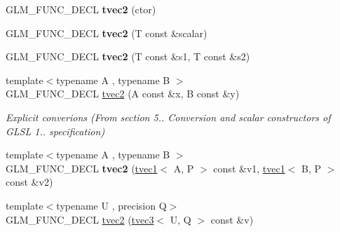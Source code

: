 \begin{DoxyCompactItemize}
\item 
\hypertarget{structglm_1_1tvec2_a0bff52067abf2c6333c7b498e4067db4}{G\-L\-M\-\_\-\-F\-U\-N\-C\-\_\-\-D\-E\-C\-L {\bfseries tvec2} (ctor)}\label{structglm_1_1tvec2_a0bff52067abf2c6333c7b498e4067db4}

\item 
\hypertarget{structglm_1_1tvec2_abe27eba923d27f2b4feb00c41a80f6f6}{G\-L\-M\-\_\-\-F\-U\-N\-C\-\_\-\-D\-E\-C\-L {\bfseries tvec2} (T const \&scalar)}\label{structglm_1_1tvec2_abe27eba923d27f2b4feb00c41a80f6f6}

\item 
\hypertarget{structglm_1_1tvec2_a240f0e106b725237513d2128c53e798e}{G\-L\-M\-\_\-\-F\-U\-N\-C\-\_\-\-D\-E\-C\-L {\bfseries tvec2} (T const \&s1, T const \&s2)}\label{structglm_1_1tvec2_a240f0e106b725237513d2128c53e798e}

\item 
\hypertarget{structglm_1_1tvec2_a100b3001f4ba3e898f6dbef516310e68}{{\footnotesize template$<$typename A , typename B $>$ }\\G\-L\-M\-\_\-\-F\-U\-N\-C\-\_\-\-D\-E\-C\-L \hyperlink{structglm_1_1tvec2_a100b3001f4ba3e898f6dbef516310e68}{tvec2} (A const \&x, B const \&y)}\label{structglm_1_1tvec2_a100b3001f4ba3e898f6dbef516310e68}

\begin{DoxyCompactList}\small\item\em Explicit converions (From section 5.. Conversion and scalar constructors of G\-L\-S\-L 1.. specification) \end{DoxyCompactList}\item 
\hypertarget{structglm_1_1tvec2_a235db039294c64b2b05b42f8a6b65ffe}{{\footnotesize template$<$typename A , typename B $>$ }\\G\-L\-M\-\_\-\-F\-U\-N\-C\-\_\-\-D\-E\-C\-L {\bfseries tvec2} (\hyperlink{structglm_1_1tvec1}{tvec1}$<$ A, P $>$ const \&v1, \hyperlink{structglm_1_1tvec1}{tvec1}$<$ B, P $>$ const \&v2)}\label{structglm_1_1tvec2_a235db039294c64b2b05b42f8a6b65ffe}

\item 
\hypertarget{structglm_1_1tvec2_a9b2fdfe551a1905a663122f78b918728}{{\footnotesize template$<$typename U , precision Q$>$ }\\G\-L\-M\-\_\-\-F\-U\-N\-C\-\_\-\-D\-E\-C\-L \hyperlink{structglm_1_1tvec2_a9b2fdfe551a1905a663122f78b918728}{tvec2} (\hyperlink{structglm_1_1tvec3}{tvec3}$<$ U, Q $>$ const \&v)}\label{structglm_1_1tvec2_a9b2fdfe551a1905a663122f78b918728}


\end{DoxyCompactItemize}
